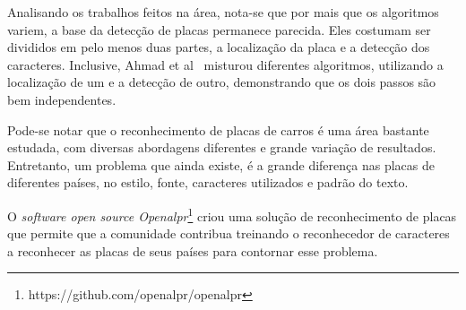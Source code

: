 Analisando os trabalhos feitos na área, nota-se que por mais que os algoritmos variem,
a base da detecção de placas permanece parecida. Eles costumam ser divididos em pelo
menos duas partes, a localização da placa e a detecção dos caracteres. Inclusive, Ahmad et al~\cite{ahmad2015automatic}
misturou diferentes algoritmos, utilizando a localização de um e a detecção de
outro, demonstrando que os dois passos são bem independentes.

Pode-se notar que o reconhecimento de placas de carros é uma área bastante estudada,
com diversas abordagens diferentes e grande variação de resultados. Entretanto,
um problema que ainda existe, é a grande diferença nas placas de diferentes países,
no estilo, fonte, caracteres utilizados e padrão do texto.

O \emph{software open source Openalpr}\footnote{https://github.com/openalpr/openalpr}
criou uma solução de reconhecimento de placas que permite que a comunidade contribua
treinando o reconhecedor de caracteres a reconhecer as placas de seus países para contornar
esse problema.
